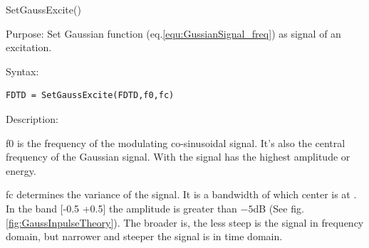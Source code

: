 \begin{FontNameFunct}{SetGaussExcite()}
 \label{func:SetGaussExcite}
\end{FontNameFunct}

\begin{FontDescr}{Purpose:}
 Set Gaussian function (eq.\ref{equ:GussianSignal_freq}) as signal of an excitation.
\end{FontDescr}

\begin{FontDescr}{Syntax:}
      \begin{lstlisting}
FDTD = SetGaussExcite(FDTD,f0,fc)
      \end{lstlisting}
\end{FontDescr}

\begin{FontDescr}{Description:}
    \begin{FontPara}{f0}  \label{para:f0}
    is the frequency of the modulating co-sinusoidal signal. It's also the central frequency of the Gaussian signal. With  the signal has the highest amplitude or energy.
    \end{FontPara}
    \begin{FontPara}{fc}  \label{para:fc}
 determines the variance of the signal. It is a bandwidth of which center is at . In the band [-0.5 \quad {}+0.5] the amplitude is greater than $-5$dB (See fig. \ref{fig:GaussInpulseTheory}).
The broader  is, the less steep is the signal in frequency domain, but narrower and steeper the signal is in time domain.
    \end{FontPara}
\end{FontDescr}


